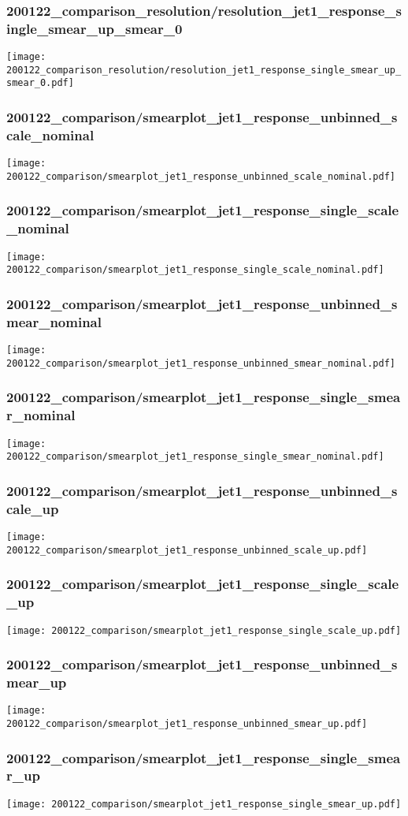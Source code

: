 \begin{frame}
   \frametitle{\small 200122\_comparison\_resolution/resolution\_jet1\_response\_single\_smear\_up\_smear\_0}
   \centering
   \texttt{[image: 200122\_comparison\_resolution/resolution\_jet1\_response\_single\_smear\_up\_smear\_0.pdf]}
\end{frame}

\begin{frame}
   \frametitle{\small 200122\_comparison/smearplot\_jet1\_response\_unbinned\_scale\_nominal}
   \centering
   \texttt{[image: 200122\_comparison/smearplot\_jet1\_response\_unbinned\_scale\_nominal.pdf]}
\end{frame}

\begin{frame}
   \frametitle{\small 200122\_comparison/smearplot\_jet1\_response\_single\_scale\_nominal}
   \centering
   \texttt{[image: 200122\_comparison/smearplot\_jet1\_response\_single\_scale\_nominal.pdf]}
\end{frame}

\begin{frame}
   \frametitle{\small 200122\_comparison/smearplot\_jet1\_response\_unbinned\_smear\_nominal}
   \centering
   \texttt{[image: 200122\_comparison/smearplot\_jet1\_response\_unbinned\_smear\_nominal.pdf]}
\end{frame}

\begin{frame}
   \frametitle{\small 200122\_comparison/smearplot\_jet1\_response\_single\_smear\_nominal}
   \centering
   \texttt{[image: 200122\_comparison/smearplot\_jet1\_response\_single\_smear\_nominal.pdf]}
\end{frame}

\begin{frame}
   \frametitle{\small 200122\_comparison/smearplot\_jet1\_response\_unbinned\_scale\_up}
   \centering
   \texttt{[image: 200122\_comparison/smearplot\_jet1\_response\_unbinned\_scale\_up.pdf]}
\end{frame}

\begin{frame}
   \frametitle{\small 200122\_comparison/smearplot\_jet1\_response\_single\_scale\_up}
   \centering
   \texttt{[image: 200122\_comparison/smearplot\_jet1\_response\_single\_scale\_up.pdf]}
\end{frame}

\begin{frame}
   \frametitle{\small 200122\_comparison/smearplot\_jet1\_response\_unbinned\_smear\_up}
   \centering
   \texttt{[image: 200122\_comparison/smearplot\_jet1\_response\_unbinned\_smear\_up.pdf]}
\end{frame}

\begin{frame}
   \frametitle{\small 200122\_comparison/smearplot\_jet1\_response\_single\_smear\_up}
   \centering
   \texttt{[image: 200122\_comparison/smearplot\_jet1\_response\_single\_smear\_up.pdf]}
\end{frame}

